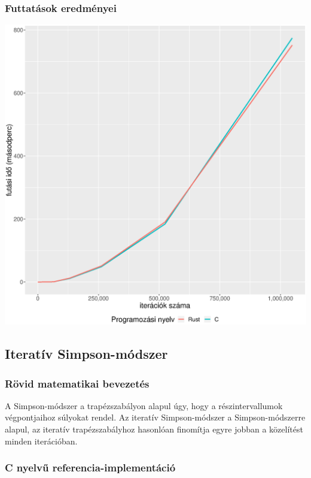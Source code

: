 \subsubsection{Futtatások eredményei}

\includegraphics[width=15.5cm]{kepek/trapedozial_rule_run.eps}

\subsection{Iteratív Simpson-módszer}

\subsubsection{Rövid matematikai bevezetés}

A Simpson-módszer a trapézszabályon alapul úgy, hogy a részintervallumok végpontjaihoz súlyokat rendel. Az iteratív Simpson-módszer a Simpson-módszerre alapul, az iteratív trapézszabályhoz hasonlóan finomítja egyre jobban a közelítést minden iterációban.

\subsubsection{C nyelvű referencia-implementáció}

